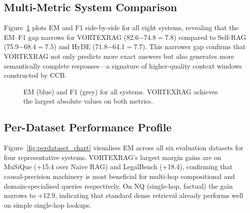 \documentclass[10pt,twocolumn]{article}
\begin{document}
\subsection{Multi-Metric System Comparison}

Figure~\ref{fig:multibar} plots EM and F1 side-by-side for all eight systems,
revealing that the EM--F1 gap narrows for VORTEXRAG (82.6$-$74.8$=7.8$)
compared to Self-RAG (75.9$-$68.4$=7.5$) and HyDE (71.8$-$64.1$=7.7$).
This narrower gap confirms that VORTEXRAG not only predicts more exact answers
but also generates more semantically complete responses---a signature of
higher-quality context windows constructed by CCB.

\begin{figure}[h]
\centering
{}
\caption{EM (blue) and F1 (grey) for all systems.  VORTEXRAG achieves the
largest absolute values on both metrics.}
\label{fig:multibar}
\end{figure}

\subsection{Per-Dataset Performance Profile}

Figure~\ref{fig:perdataset_chart} visualises EM across all six evaluation
datasets for four representative systems.  VORTEXRAG's largest margin gains
are on MuSiQue ($+$15.4 over Naive RAG) and LegalBench ($+$18.4), confirming
that causal-precision machinery is most beneficial for multi-hop compositional
and domain-specialised queries respectively.  On NQ (single-hop, factual)
the gain narrows to $+$12.9, indicating that standard dense retrieval already
performs well on simple single-hop lookups.
\end{document}
